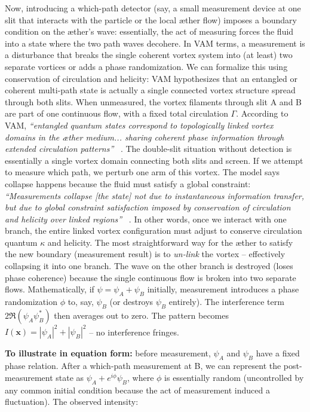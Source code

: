 \documentclass[a4paper, aps,preprint,superscriptaddress, 12pt]{revtex4}
\begin{document}
Now, introducing a which-path detector (say, a small measurement device at one slit that interacts with the particle or the local æther flow) imposes a boundary condition on the æther’s wave: essentially, the act of measuring forces the fluid into a state where the two path waves decohere. In VAM terms, a measurement is a disturbance that breaks the single coherent vortex system into (at least) two separate vortices or adds a phase randomization. We can formalize this using conservation of circulation and helicity: VAM hypothesizes that an entangled or coherent multi-path state is actually a single connected vortex structure spread through both slits. When unmeasured, the vortex filaments through slit A and B are part of one continuous flow, with a fixed total circulation $\Gamma$. According to VAM, \textit{“entangled quantum states correspond to topologically linked vortex domains in the æther medium... sharing coherent phase information through extended circulation patterns”}~\cite{Iskandarani2025c} . The double-slit situation without detection is essentially a single vortex domain connecting both slits and screen. If we attempt to measure which path, we perturb one arm of this vortex. The model says collapse happens because the fluid must satisfy a global constraint: \textit{“Measurements collapse [the state] not due to instantaneous information transfer, but due to global constraint satisfaction imposed by conservation of circulation and helicity over linked regions”}~\cite{Iskandarani2025c} . In other words, once we interact with one branch, the entire linked vortex configuration must adjust to conserve circulation quantum $\kappa$ and helicity. The most straightforward way for the æther to satisfy the new boundary (measurement result) is to \textit{un-link} the vortex – effectively collapsing it into one branch. The wave on the other branch is destroyed (loses phase coherence) because the single continuous flow is broken into two separate flows. Mathematically, if $\psi = \psi_A + \psi_B$ initially, measurement introduces a phase randomization $\phi$ to, say, $\psi_B$ (or destroys $\psi_B$ entirely). The interference term $2\Re(\psi_A\psi_B^*)$ then averages out to zero. The pattern becomes $I(\mathbf{x}) = |\psi_A|^2 + |\psi_B|^2$ – no interference fringes.


\textbf{To illustrate in equation form:} before measurement, $\psi_A$ and $\psi_B$ have a fixed phase relation. After a which-path measurement at B, we can represent the post-measurement state as $\psi_A + e^{i\phi}\psi_B$, where $\phi$ is essentially random (uncontrolled by any common initial condition because the act of measurement induced a fluctuation). The observed intensity:
\end{document}
